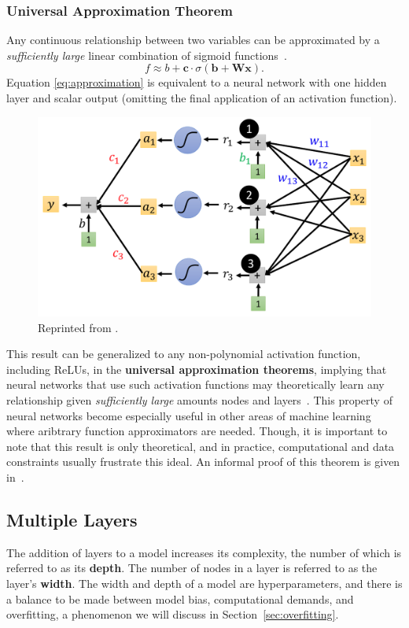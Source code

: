 \documentclass[12pt]{report}
\theoremstyle{definition}
\theoremstyle{remark}
\begin{document}
\subsubsection{Universal Approximation Theorem}
Any continuous relationship between two variables can be approximated by a \textit{sufficiently large} linear combination of sigmoid functions~\cite{cybenko_approximation_1989}.
\begin{equation} \label{eq:approximation}
    f \approx b + \mathbf{c} \cdot \sigma(\mathbf{b} + \mathbf{W}\mathbf{x}).
\end{equation}
Equation \ref{eq:approximation} is equivalent to a neural network with one hidden layer and scalar output (omitting the final application of an activation function).
\begin{figure}[h]
    \centering
    \includegraphics[width=0.5\linewidth]{figs/simple.png}
    \caption{Reprinted from \cite{lee_introduction_2021}.}
    \label{fig:enter-label}
\end{figure}

This result can be generalized to any non-polynomial activation function, including ReLUs, in the \textbf{universal approximation theorems}, implying that neural networks that use such activation functions may theoretically learn any relationship given \textit{sufficiently large} amounts nodes and layers~\cite{hornik_multilayer_1989, kidger_universal_2020, pinkus_approximation_1999}. This property of neural networks become especially useful in other areas of machine learning where aribtrary function approximators are needed. Though, it is important to note that this result is only theoretical, and in practice, computational and data constraints usually frustrate this ideal. An informal proof of this theorem is given in~\cite{nielsen_neural_2019}.

\subsection{Multiple Layers}

The addition of layers to a model increases its complexity, the number of which is referred to as its \textbf{depth}. The number of nodes in a layer is referred to as the layer's \textbf{width}. The width and depth of a model are hyperparameters, and there is a balance to be made between model bias, computational demands, and overfitting, a phenomenon we will discuss in Section~\ref{sec:overfitting}.
\end{document}
